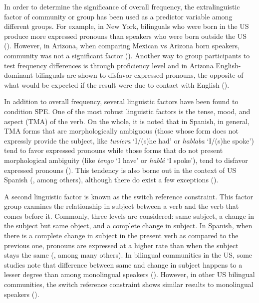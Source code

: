 \documentclass[output=paper]{langscibook}
\begin{document}
In order to determine the significance of overall frequency, the extralinguistic factor of community or group has been used as a predictor variable among different groups. For example, in New York, bilinguals who were born in the US produce more expressed pronouns than speakers who were born outside the US (\citealt{OtheguyLivert2007, OtheguyZentella2012}). However, in Arizona, when comparing Mexican vs Arizona born speakers, community was not a significant factor (\citealt{Bessett2018}). Another way to group participants to test frequency differences is through proficiency level and in Arizona English-dominant bilinguals are shown to disfavor expressed pronouns, the opposite of what would be expected if the result were due to contact with English (\citealt{Cerrón-Palomino2016}).



In addition to overall frequency, several linguistic factors have been found to condition SPE.  One of the most robust linguistic factors is the tense, mood, and aspect (TMA) of the verb. On the whole, it is noted that in Spanish, in general, TMA forms that are morphologically ambiguous (those whose form does not expressly provide the subject, like \textit{tuviera} ‘I/(s)he had’ or \textit{hablaba} ‘I/(s)he spoke’) tend to favor expressed pronouns while those forms that do not present morphological ambiguity (like \textit{tengo} ‘I have’ or \textit{hablé} ‘I spoke’), tend to disfavor expressed pronouns (\citealt{CarvalhoShin2015}). This tendency is also borne out in the context of US Spanish (\citealt{OtheguyZentella2012, ShinMontes-Alcalá2014, Cerrón-Palomino2016, Limerick2017}, among others), although there do exist a few exceptions (\citealt{LapidusShin2014, Limerick2019}).



A second linguistic factor is known as the switch reference constraint. This factor group examines the relationship in subject between a verb and the verb that comes before it. Commonly, three levels are considered: same subject, a change in the subject but same object, and a complete change in subject. In Spanish, when there is a complete change in subject in the present verb as compared to the previous one, pronouns are expressed at a higher rate than when the subject stays the same (\citealt{CarvalhoShin2015}, among many others). In bilingual communities in the US, some studies note that difference between same and change in subject happens to a lesser degree than among monolingual speakers (\citealt{OtheguyZentella2012, Limerick2017}). However, in other US bilingual communities, the switch reference constraint shows similar results to monolingual speakers (\citealt{Silva-Corvalán1994, Hurtado2001, TorresCacoullosTravis2018, Cerrón-Palomino2016, Bessett2018}).
\end{document}
